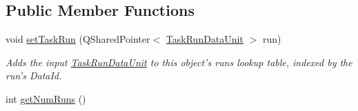 \subsection*{Public Member Functions}
\begin{DoxyCompactItemize}
\item 
\hypertarget{class_picto_1_1_session_data_package_a8b8425bded1a6a5722f329facea1b781}{void \hyperlink{class_picto_1_1_session_data_package_a8b8425bded1a6a5722f329facea1b781}{set\-Task\-Run} (Q\-Shared\-Pointer$<$ \hyperlink{class_picto_1_1_task_run_data_unit}{Task\-Run\-Data\-Unit} $>$ run)}\label{class_picto_1_1_session_data_package_a8b8425bded1a6a5722f329facea1b781}

\begin{DoxyCompactList}\small\item\em Adds the input \hyperlink{class_picto_1_1_task_run_data_unit}{Task\-Run\-Data\-Unit} to this object's runs lookup table, indexed by the run's Data\-Id. \end{DoxyCompactList}\item 
\hypertarget{class_picto_1_1_session_data_package_a6fffc671303fe229095bbf4fbe1e939a}{int \hyperlink{class_picto_1_1_session_data_package_a6fffc671303fe229095bbf4fbe1e939a}{get\-Num\-Runs} ()}\label{class_picto_1_1_session_data_package_a6fffc671303fe229095bbf4fbe1e939a}


\end{DoxyCompactItemize}
